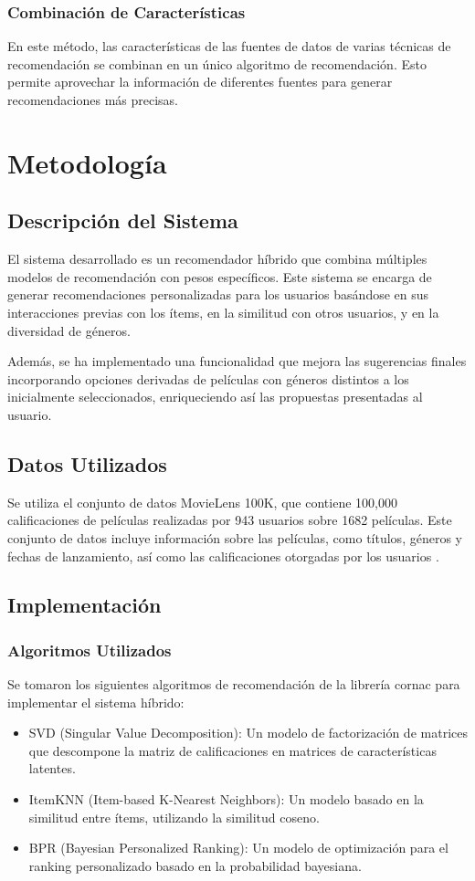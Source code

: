 \documentclass[a4paper,12pt]{report}
\begin{document}
        \subsection{Combinación de Características}
En este método, las características de las fuentes de datos de varias técnicas de recomendación se combinan en un único algoritmo de recomendación. Esto permite aprovechar la información de diferentes fuentes para generar recomendaciones más precisas.
\chapter{Metodología}
\section{Descripción del Sistema}
El sistema desarrollado es un recomendador híbrido que combina múltiples modelos de recomendación con pesos específicos. Este sistema se encarga de generar recomendaciones personalizadas para los usuarios basándose en sus interacciones previas con los ítems, en la similitud con otros usuarios, y en la diversidad de géneros. 

Además, se ha implementado una funcionalidad que mejora las sugerencias finales incorporando opciones derivadas de películas con géneros distintos a los inicialmente seleccionados, enriqueciendo así las propuestas presentadas al usuario.\section{Datos Utilizados}
Se utiliza el conjunto de datos MovieLens 100K, que contiene 100,000 calificaciones de películas realizadas por 943 usuarios sobre 1682 películas. Este conjunto de datos incluye información sobre las películas, como títulos, géneros y fechas de lanzamiento, así como las calificaciones otorgadas por los usuarios \cite{movielens}.

\section{Implementación}
\subsection{Algoritmos Utilizados}
Se tomaron los siguientes algoritmos de recomendación de la librería cornac \cite{cornac} para implementar el sistema híbrido:
\begin{itemize}
    \item SVD (Singular Value Decomposition): Un modelo de factorización de matrices que descompone la matriz de calificaciones en matrices de características latentes.
    \item ItemKNN (Item-based K-Nearest Neighbors): Un modelo basado en la similitud entre ítems, utilizando la similitud coseno.
    \item BPR (Bayesian Personalized Ranking): Un modelo de optimización para el ranking personalizado basado en la probabilidad bayesiana.
\end{itemize}
\end{document}
